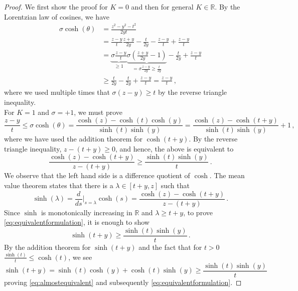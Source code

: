 \documentclass[10pt,a4paper]{amsart}
\newcommand{\R}{\mathbb R}
\begin{document}
\begin{proof}
    We first show the proof for $K=0$ and then for general $K\in\R$.
    By the Lorentzian law of cosines, we have
    \begin{align*}
        \sigma \cosh(\theta)&=\frac{z^2-y^2-t^2}{2yt}\\
        &=\frac{z-y}{t} \frac{z+y}{2y}-\frac{t}{2y} - \frac{z-y}{t} + \frac{z-y}{t}\\
        &=\underbrace{\sigma\frac{z-y}{t}}_{\geq1}\underbrace{\sigma\left(\frac{z+y}{2y}-1\right)}_{=\sigma\frac{z-y}{2y}\geq\frac{t}{2y}}-\frac{t}{2y}+\frac{z-y}{t}\\
        &\geq\frac{t}{2y}-\frac{t}{2y}+\frac{z-y}{t}=\frac{z-y}{t} \, ,
    \end{align*}
    where we used multiple times that $\sigma(z-y)\geq t$ by the reverse triangle inequality. \\

    For $K=1$ and $\sigma=+1$, we must prove
    \begin{equation*}
        \frac{z-y}{t} \leq 
        \sigma \cosh(\theta) =\frac{\cosh(z) - \cosh(t)\cosh(y)}{\sinh(t) \sinh(y)} 
        =\frac{\cosh(z) - \cosh(t+y)}{\sinh(t) \sinh(y)} +1 \, , 
    \end{equation*}
    where we have used the addition theorem for $\cosh(t+y)$. By the reverse triangle inequality, $z-(t+y)\geq 0$, and hence, the above is equivalent to 
    \begin{equation}\label{eq:equivalentformulation}
    \frac{\cosh(z)-\cosh(t+y)}{z-(t+y)} \geq \frac{\sinh(t)\sinh(y)}{t} \, .
    \end{equation}
    We observe that the left hand side is a difference quotient of $\cosh$. The mean value theorem states that there is a $\lambda\in[t+y,z]$ such that 
    \[\sinh(\lambda)=\frac{d}{d s}\bigg|_{s=\lambda}\cosh(s) = \frac{\cosh(z)-\cosh(t+y)}{z-(t+y)} \, .\]
    Since $\sinh$ is monotonically increasing in $\R$ and $\lambda\geq t+y$, to prove \eqref{eq:equivalentformulation}, it is enough to show
    \begin{equation}\label{eq:almostequivalent}
    \sinh(t+y) \geq \frac{\sinh(t)\sinh(y)}{t} \, .
    \end{equation}
    By the addition theorem for $\sinh(t+y)$ and the fact that for $t>0$ $\frac{\sinh(t)}{t}\leq \cosh(t)$, we see
    \[\sinh(t+y)=\sinh(t)\cosh(y)+\cosh(t)\sinh(y)\geq\frac{\sinh(t)\sinh(y)}{t}\]
    proving \eqref{eq:almostequivalent} and subsequently \eqref{eq:equivalentformulation}. 


\end{proof}
\end{document}
